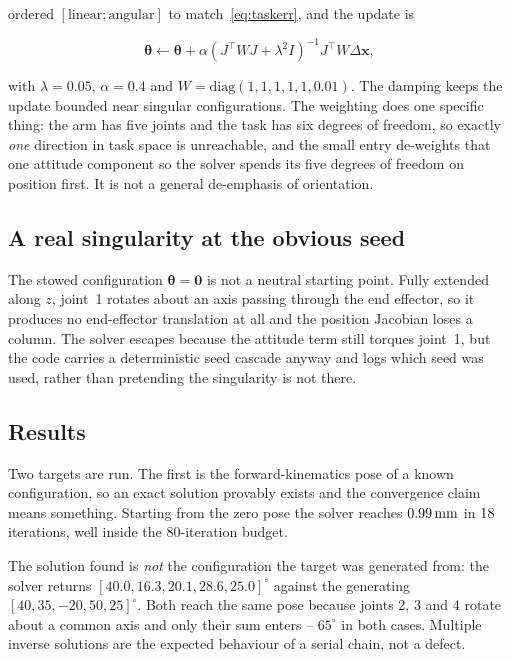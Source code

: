 ordered $[\text{linear};\text{angular}]$ to match~\eqref{eq:taskerr}, and the
update is

\begin{equation}
\boldsymbol\theta \leftarrow \boldsymbol\theta + \alpha\left(J^\top W J + \lambda^2 I\right)^{-1} J^\top W \Delta\mathbf x,
\label{eq:wdls}
\end{equation}

with $\lambda = 0.05$, $\alpha = 0.4$ and
$W = \mathrm{diag}(1,1,1,1,1,0.01)$. The damping keeps the update bounded near
singular configurations. The weighting does one specific thing: the arm has five
joints and the task has six degrees of freedom, so exactly \emph{one} direction
in task space is unreachable, and the small entry de-weights that one attitude
component so the solver spends its five degrees of freedom on position first.
It is not a general de-emphasis of orientation.

\subsection{A real singularity at the obvious seed}

The stowed configuration $\boldsymbol\theta = \mathbf 0$ is not a neutral
starting point. Fully extended along $z$, joint~1 rotates about an axis passing
through the end effector, so it produces no end-effector translation at all and
the position Jacobian loses a column. The solver escapes because the attitude
term still torques joint~1, but the code carries a deterministic seed cascade
anyway and logs which seed was used, rather than pretending the singularity is
not there.

\subsection{Results}

Two targets are run. The first is the forward-kinematics pose of a known
configuration, so an exact solution provably exists and the convergence claim
means something. Starting from the zero pose the solver reaches
$0.99\,\mathrm{mm}$ in $18$ iterations, well inside the $80$-iteration
budget.

The solution found is \emph{not} the configuration the target was generated
from: the solver returns $[40.0, 16.3, 20.1, 28.6, 25.0]^\circ$ against the
generating $[40, 35, -20, 50, 25]^\circ$. Both reach the same pose because
joints 2, 3 and 4 rotate about a common axis and only their sum enters -- $65^\circ$
in both cases. Multiple inverse solutions are the expected behaviour of a serial
chain, not a defect.

